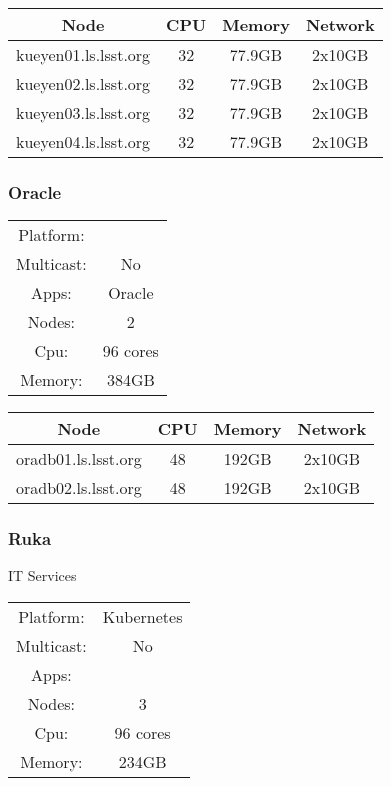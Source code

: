 \begin{center}
  \begin{tabular}{||c c c c||} 
    \hline
    Node & CPU & Memory & Network \\ [0.5ex] 
    \hline\hline
    kueyen01.ls.lsst.org & 32 & 77.9GB & 2x10GB \\
    \hline
    kueyen02.ls.lsst.org & 32 & 77.9GB & 2x10GB \\
    \hline
    kueyen03.ls.lsst.org & 32 & 77.9GB & 2x10GB \\
    \hline
    kueyen04.ls.lsst.org & 32 & 77.9GB & 2x10GB \\
    \hline
  \end{tabular}
\end{center}

\subsubsection{Oracle}

\begin{center}
  \begin{tabular}{ |c|c| } 
   \hline
   Platform: &  \\ 
   Multicast: & No \\ 
   Apps: & Oracle \\ 
   Nodes: & 2 \\ 
   Cpu: & 96 cores \\ 
   Memory: & 384GB \\ 
   \hline
  \end{tabular}
\end{center}

\begin{center}
  \begin{tabular}{||c c c c||} 
    \hline
    Node & CPU & Memory & Network \\ [0.5ex] 
    \hline\hline
    oradb01.ls.lsst.org & 48 & 192GB & 2x10GB \\
    \hline
    oradb02.ls.lsst.org & 48 & 192GB & 2x10GB \\
    \hline
  \end{tabular}
\end{center}

\newpage
\subsubsection{Ruka}

IT Services

\begin{center}
  \begin{tabular}{ |c|c| } 
   \hline
   Platform: & Kubernetes \\ 
   Multicast: & No \\ 
   Apps: &  \\ 
   Nodes: & 3 \\ 
   Cpu: & 96 cores \\ 
   Memory: & 234GB \\ 
   \hline
  \end{tabular}
\end{center}

